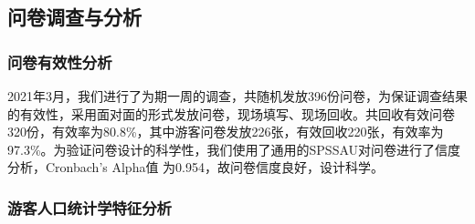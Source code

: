 \documentclass[UTF8]{ctexart}
\begin{document}
    \subsection{问卷调查与分析}
        \subsubsection{问卷有效性分析}
        2021年3月，我们进行了为期一周的调查，共随机发放396份问卷，为保证调查结果的有效性，采用面对面的形式发放问卷，现场填写、现场回收。共回收有效问卷320份，有效率为80.8\%，其中游客问卷发放226张，有效回收220张，有效率为97.3\%。为验证问卷设计的科学性，我们使用了通用的SPSSAU对问卷进行了信度分析，Cronbach’s Alpha值 为0.954，故问卷信度良好，设计科学。
        \subsubsection{游客人口统计学特征分析}
\end{document}
